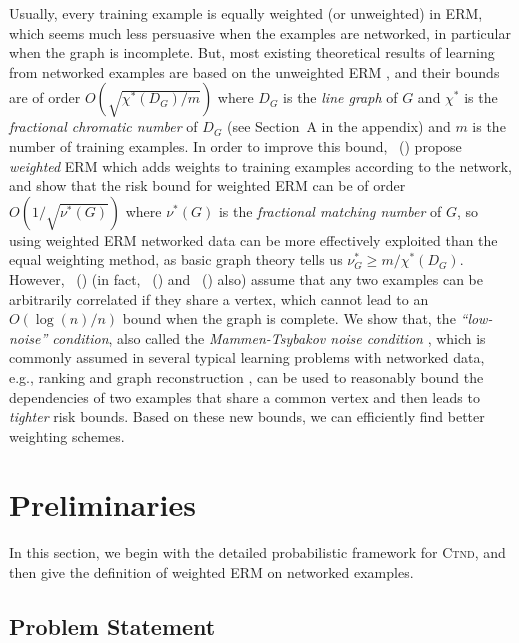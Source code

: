 \documentclass[letterpaper]{article} %
\newcommand{\problemabbr}{\textnormal{C}\textsc{tnd}}
\newcommand{\citet}[1]{\citeauthor{#1}\ (\citeyear{#1})}
\begin{document}
Usually, every training example is equally weighted (or unweighted) in ERM, which seems much less persuasive when the examples are networked, in particular when the graph is incomplete. But, most existing theoretical results of learning from networked examples are based on the unweighted ERM \cite{Usunier2005,ralaivola2009chromatic}, and their bounds are of order $O(\sqrt{\chi^*(D_G)/m})$ where $D_G$ is the \emph{line graph} of $G$ and $\chi^*$ is the \emph{fractional chromatic number} of $D_G$ (see Section~A in the appendix) and $m$ is the number of training examples. 
In order to improve this bound, \citet{wang2017learning} propose \emph{weighted} ERM %
which adds weights to training examples 
according to the network, and show that the risk bound for weighted ERM can be of order $O(1/\sqrt{\nu^*(G)})$ where $\nu^*(G)$ is the \emph{fractional matching number} of $G$, so using weighted ERM networked data can be more effectively exploited than the equal weighting method, as basic graph theory tells us $\nu^*_G\ge m / \chi^*(D_G)$. 
However, \citet{wang2017learning} (in fact, \citet{Usunier2005} and \citet{ralaivola2009chromatic} also) assume that any two examples can be arbitrarily correlated if they share a vertex, which cannot lead to an $O(\log(n)/n)$ bound when the graph is complete. 
We show that, the \emph{``low-noise'' condition}, also called the \emph{Mammen-Tsybakov noise condition}  \cite{Mammen1998Smooth}, which is commonly assumed in several typical learning problems with networked data, e.g., ranking \cite{clemenccon2008ranking} and graph reconstruction \cite{papa2016graph}, can be used to reasonably bound the dependencies of two examples that share a common vertex and then leads to \emph{tighter} risk bounds. 
Based on these new bounds, we can efficiently find better weighting schemes. 

\section{Preliminaries} %
\label{sec:preliminaries}

In this section, we begin with the detailed probabilistic framework for \problemabbr{}, and then give the definition of weighted ERM on networked examples. 

\subsection{Problem Statement} %
\label{sub:problem_statement}
\end{document}
